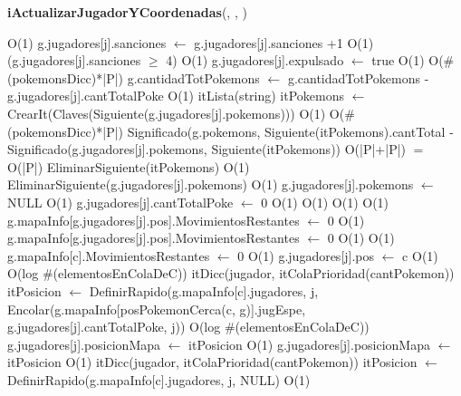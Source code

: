 \begin{Algoritmos}
\begin{algorithm}[H]{\textbf{iActualizarJugadorYCoordenadas}(, , )}
	\begin{algorithmic}[1]
	\begin{scriptsize}
		 \Comment O(1)
			\State g.jugadores[j].sanciones $\gets$ g.jugadores[j].sanciones +1 \Comment O(1)
			\If(g.jugadores[j].sanciones $\geq$ 4) \Comment O(1)
				\State g.jugadores[j].expulsado $\gets$ true \Comment O(1)			
			\EndIf
		\EndIf
		 \Comment O($\#$(pokemonsDicc)*|P|)
			\State g.cantidadTotPokemons $\gets$ g.cantidadTotPokemons - g.jugadores[j].cantTotalPoke \Comment O(1)
			\State itLista(string) itPokemons $\gets$ CrearIt(Claves(Siguiente(g.jugadores[j].pokemons))) \Comment O(1)
			 \Comment O($\#$(pokemonsDicc)*|P|)
				\State Significado(g.pokemons, Siguiente(itPokemons).cantTotal - Significado(g.jugadores[j].pokemons, Siguiente(itPokemons)) \Comment O(|P|+|P|) $=$ O(|P|)
				\State EliminarSiguiente(itPokemons) \Comment O(1)		
			\EndWhile
			\State EliminarSiguiente(g.jugadores[j].pokemons) \Comment O(1)
			\State g.jugadores[j].pokemons $\gets$ NULL \Comment O(1)
			\State g.jugadores[j].cantTotalPoke $\gets$ 0 \Comment O(1)
		\Else
			 \Comment O(1)
				 \Comment O(1)
					 \Comment O(1)
						\State g.mapaInfo[g.jugadores[j].pos].MovimientosRestantes $\gets$ 0 \Comment O(1)				
					\EndIf
				\Else
					\State g.mapaInfo[g.jugadores[j].pos].MovimientosRestantes $\gets$ 0 \Comment O(1)						
				\EndIf
			\Else
				 \Comment O(1)
					\State g.mapaInfo[c].MovimientosRestantes $\gets$ 0 \Comment O(1)
				\EndIf						
			\EndIf
		\EndIf
		\State g.jugadores[j].pos $\gets$ c \Comment O(1)
		 \Comment O(log $\#$(elementosEnColaDeC))
			\State itDicc(jugador, itColaPrioridad(cantPokemon)) itPosicion $\gets$ DefinirRapido(g.mapaInfo[c].jugadores, j, Encolar(g.mapaInfo[posPokemonCerca(c, g)].jugEspe, g.jugadores[j].cantTotalPoke, j)) \Comment O(log $\#$(elementosEnColaDeC))
			\State g.jugadores[j].posicionMapa $\gets$ itPosicion \Comment O(1)			
			\State g.jugadores[j].posicionMapa $\gets$ itPosicion \Comment O(1)		
		\Else
			\State itDicc(jugador, itColaPrioridad(cantPokemon)) itPosicion $\gets$ DefinirRapido(g.mapaInfo[c].jugadores, j, NULL) \Comment O(1)

\end{scriptsize}
\end{algorithmic}
\end{algorithm}
\end{Algoritmos}
